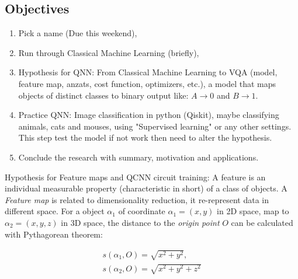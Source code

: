 \subsection{Objectives}
\begin{enumerate}
    \item Pick a name (Due this weekend),
    \item Run through Classical Machine Learning (briefly),
    \item Hypothesis for QNN: From Classical Machine Learning to VQA (model, feature map, anzats, cost function, optimizers, etc.), a model that maps objects of distinct classes to binary output like: $A \to 0$ and $B \to 1$.
    \item Practice QNN: Image classification in python (Qiskit), maybe classifying animals, cats and mouses, using "Supervised learning" or any other settings. This step test the model if not work then need to alter the hypothesis.
    \item Conclude the research with summary, motivation and applications.
\end{enumerate}

Hypothesis for Feature maps and QCNN circuit training: A feature is an individual measurable property (characteristic in short) of a class of objects. A \textit{Feature map} is related to dimensionality reduction, it re-represent data in different space.
For a object $\alpha_1$ of coordinate $\alpha_1 = (x, y)$ in 2D space, map to $\alpha_2 = (x, y, z)$ in 3D space, the distance to the \textit{origin point} $O$ can be calculated with Pythagorean theorem:

\begin{align}
    s(\alpha_1, O) = \sqrt{x^2 + y^2}, \\
    s(\alpha_2, O) = \sqrt{x^2 + y^2 + z^2}
\end{align}


